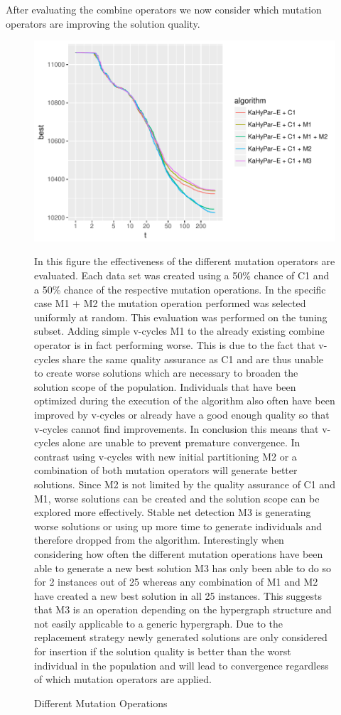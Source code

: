 \documentclass[a4paper,12pt,titlepage, BCOR7mm,headsepline]{scrbook}
\numberwithin{equation}{section}
\begin{document}
\newpage
After evaluating the combine operators we now consider which mutation operators are improving the solution quality. 
\begin{figure}[H]
\caption{Different Mutation Operations}
\begin{center}
\includegraphics{bachelorarbeit-differentoperatos}
\end{center}
In this figure the effectiveness of the different mutation operators are evaluated. Each data set was created using a 50\% chance of C1 and a 50\% chance of the respective mutation operations. In the specific case M1 + M2 the mutation operation performed was selected uniformly at random. This evaluation was performed on the tuning subset. Adding simple v-cycles M1 to the already existing combine operator is in fact performing worse. This is due to the fact that v-cycles share the same quality assurance as C1 and are thus unable to create worse solutions which are necessary to broaden the solution scope of the population. Individuals that have been optimized during the execution of the algorithm also often have been improved by v-cycles or already have a good enough quality so that v-cycles cannot find improvements. In conclusion this means that v-cycles alone are unable to prevent premature convergence. In contrast using v-cycles with new initial partitioning M2 or a combination of both mutation operators will generate better solutions. Since M2 is not limited by the quality assurance of C1 and M1, worse solutions can be created and the solution scope can be explored more effectively. Stable net detection M3 is generating worse solutions or using up more time to generate individuals and therefore dropped from the algorithm. Interestingly when considering how often the different mutation operations have been able to generate a new best solution M3 has only been able to do so for 2 instances out of 25 whereas any combination of M1 and M2 have created a new best solution in all 25 instances. This suggests that M3 is an operation depending on the hypergraph structure and not easily applicable to a generic hypergraph. Due to the replacement strategy newly generated solutions are only considered for insertion if the solution quality is better than the worst individual in the population and will lead to convergence regardless of which mutation operators are applied. 
\end{figure}
\end{document}

